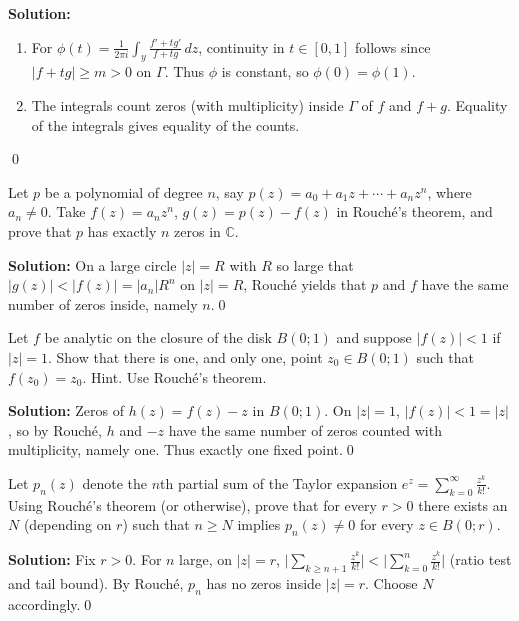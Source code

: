 \noindent\textbf{Solution:}
\begin{enumerate}[label=(\alph*)]
\item For $\phi(t)=\frac{1}{2\pi i}\int_{y}\frac{f'+t g'}{f+tg}\,dz$, continuity in $t\in[0,1]$ follows since $|f+tg|\ge m>0$ on $\Gamma$. Thus $\phi$ is constant, so $\phi(0)=\phi(1)$.
\item The integrals count zeros (with multiplicity) inside $\Gamma$ of $f$ and $f+g$. Equality of the integrals gives equality of the counts.
\end{enumerate}\qed


\begin{problembox}
Let \( p \) be a polynomial of degree \( n \), say \( p(z) = a_0 + a_1 z + \cdots + a_n z^n \), where \( a_n \neq 0 \). Take \( f(z) = a_n z^n \), \( g(z) = p(z) - f(z) \) in Rouché's theorem, and prove that \( p \) has exactly \( n \) zeros in \( \mathbb{C} \).
\end{problembox}

\noindent\textbf{Solution:}
On a large circle $|z|=R$ with $R$ so large that $|g(z)|<|f(z)|=|a_n|R^n$ on $|z|=R$, Rouché yields that $p$ and $f$ have the same number of zeros inside, namely $n$.\qed


\begin{problembox}
Let \( f \) be analytic on the closure of the disk \( B(0; 1) \) and suppose \( |f(z)| < 1 \) if \( |z| = 1 \). Show that there is one, and only one, point \( z_0 \in B(0; 1) \) such that \( f(z_0) = z_0 \). Hint. Use Rouché's theorem.
\end{problembox}

\noindent\textbf{Solution:}
Zeros of $h(z)=f(z)-z$ in $B(0;1)$. On $|z|=1$, $|f(z)|<1=|z|$, so by Rouché, $h$ and $-z$ have the same number of zeros counted with multiplicity, namely one. Thus exactly one fixed point.\qed


\begin{problembox}
Let \( p_n(z) \) denote the \( n \)th partial sum of the Taylor expansion \( e^z = \sum_{k=0}^{\infty} \frac{z^k}{k!} \). Using Rouché's theorem (or otherwise), prove that for every \( r > 0 \) there exists an \( N \) (depending on \( r \)) such that \( n \geq N \) implies \( p_n(z) \neq 0 \) for every \( z \in B(0; r) \).
\end{problembox}

\noindent\textbf{Solution:}
Fix $r>0$. For $n$ large, on $|z|=r$, $\big|\sum_{k\ge n+1} \frac{z^k}{k!}\big|<\big|\sum_{k=0}^{n} \frac{z^k}{k!}\big|$ (ratio test and tail bound). By Rouché, $p_n$ has no zeros inside $|z|=r$. Choose $N$ accordingly.\qed


